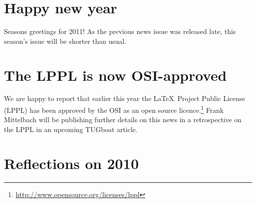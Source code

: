 \documentclass{ltnews}
\begin{document}
\maketitle


\section{Happy new year}

Seasons greetings for 2011!
As the previous news issue was released late, this season's issue will be shorter than usual.

\section{The LPPL is now OSI-approved}

We are happy to report that earlier this year the \LaTeX\ Project Public License (LPPL) has been approved by the OSI as an open source licence.\footnote{\url{http://www.opensource.org/licenses/lppl}} Frank Mittelbach will be publishing further details on this news in a retrospective on the LPPL in an upcoming TUGboat article.

\section{Reflections on 2010}
\end{document}
